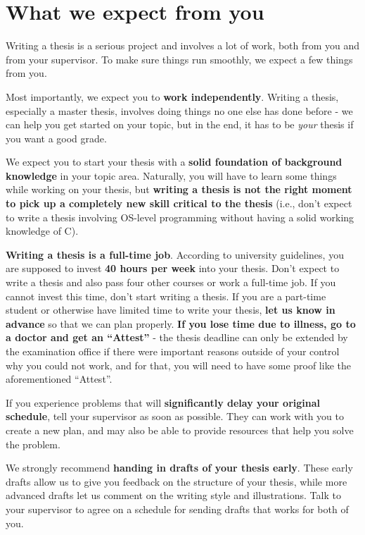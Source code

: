 \documentclass[a4paper, 11pt, hidelinks]{article}
\begin{document}
\section*{What we expect from you}
Writing a thesis is a serious project and involves a lot of work, both from you and from your supervisor.
To make sure things run smoothly, we expect a few things from you.

Most importantly, we expect you to \textbf{work independently}.
Writing a thesis, especially a master thesis, involves doing things no one else has done before - we can help you get started on your topic, but in the end, it has to be \emph{your} thesis if you want a good grade.

We expect you to start your thesis with a \textbf{solid foundation of background knowledge} in your topic area. 
Naturally, you will have to learn some things while working on your thesis, but \textbf{writing a thesis is not the right moment to pick up a completely new skill critical to the thesis} (i.e., don’t expect to write a thesis involving OS-level programming without having a solid working knowledge of C).

\textbf{Writing a thesis is a full-time job}.
According to university guidelines, you are supposed to invest \textbf{40 hours per week} into your thesis.
Don’t expect to write a thesis and also pass four other courses or work a full-time job.
If you cannot invest this time, don’t start writing a thesis.
If you are a part-time student or otherwise have limited time to write your thesis, \textbf{let us know in advance} so that we can plan properly.
\textbf{If you lose time due to illness, go to a doctor and get an ``Attest''} - the thesis deadline can only be extended by the examination office if there were important reasons outside of your control why you could not work, and for that, you will need to have some proof like the aforementioned ``Attest''.

If you experience problems that will \textbf{significantly delay your original schedule}, tell your supervisor as soon as possible.
They can work with you to create a new plan, and may also be able to provide resources that help you solve the problem.

We strongly recommend \textbf{handing in drafts of your thesis early}.
These early drafts allow us to give you feedback on the structure of your thesis, while more advanced drafts let us comment on the writing style and illustrations.
Talk to your supervisor to agree on a schedule for sending drafts that works for both of you.
\end{document}
